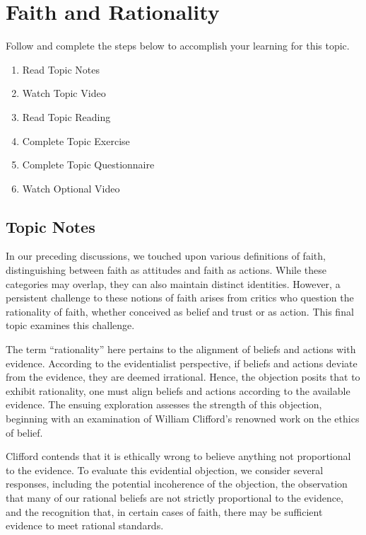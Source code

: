 \documentclass[
]{book}
\providecommand{\tightlist}{%
  \setlength{\itemsep}{0pt}\setlength{\parskip}{0pt}}
\begin{document}
\hypertarget{faith-and-rationality}{%
\section{Faith and Rationality}\label{faith-and-rationality}}

Follow and complete the steps below to accomplish your learning for this topic.

\begin{enumerate}
\def\labelenumi{\arabic{enumi}.}
\tightlist
\item
  Read Topic Notes
\item
  Watch Topic Video
\item
  Read Topic Reading
\item
  Complete Topic Exercise
\item
  Complete Topic Questionnaire
\item
  Watch Optional Video
\end{enumerate}

\hypertarget{topic-notes-7}{%
\subsection*{Topic Notes}\label{topic-notes-7}}

In our preceding discussions, we touched upon various definitions of faith, distinguishing between faith as attitudes and faith as actions. While these categories may overlap, they can also maintain distinct identities. However, a persistent challenge to these notions of faith arises from critics who question the rationality of faith, whether conceived as belief and trust or as action. This final topic examines this challenge.

The term ``rationality'' here pertains to the alignment of beliefs and actions with evidence. According to the evidentialist perspective, if beliefs and actions deviate from the evidence, they are deemed irrational. Hence, the objection posits that to exhibit rationality, one must align beliefs and actions according to the available evidence. The ensuing exploration assesses the strength of this objection, beginning with an examination of William Clifford's renowned work on the ethics of belief.

Clifford contends that it is ethically wrong to believe anything not proportional to the evidence. To evaluate this evidential objection, we consider several responses, including the potential incoherence of the objection, the observation that many of our rational beliefs are not strictly proportional to the evidence, and the recognition that, in certain cases of faith, there may be sufficient evidence to meet rational standards.
\end{document}
